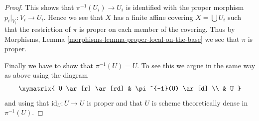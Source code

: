 \begin{proof}
\medskip\noindent
This shows that $\pi^{-1}(U_i) \to U_i$ is identified with the proper
morphism $p_i|_{V_i} : V_i \to U_i$. Hence we see that $X$ has a
finite affine covering $X = \bigcup U_i$ such that the restriction
of $\pi$ is proper on each member of the covering.
Thus by Morphisms, Lemma \ref{morphisms-lemma-proper-local-on-the-base}
we see that $\pi$ is proper.

\medskip\noindent
Finally we have to show that $\pi^{-1}(U) = U$. To see this we argue in the
same way as above using the diagram
$$
\xymatrix{
U \ar[r] \ar[rd] & \pi^{-1}(U) \ar[d] \\
& U
}
$$
and using that $\text{id}_U : U \to U$ is proper and that
$U$ is scheme theoretically dense in $\pi^{-1}(U)$.
\end{proof}